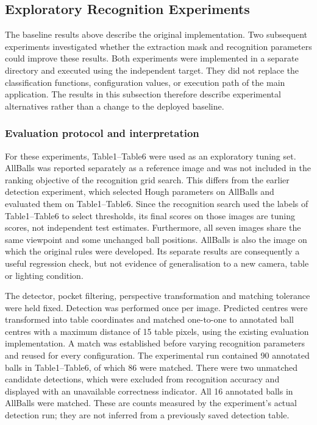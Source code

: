 \subsection{Exploratory Recognition Experiments}
\label{sec:recognition-experiments}

The baseline results above describe the original implementation. Two subsequent
experiments investigated whether the extraction mask and recognition parameters
could improve these results. Both experiments were implemented in a separate
 directory and executed using the independent
 target. They did not replace the classification functions,
configuration values, or execution path of the main application. The results in
this subsection therefore describe experimental alternatives rather than a
change to the deployed baseline.

\subsubsection{Evaluation protocol and interpretation}

For these experiments, Table1--Table6 were used as an exploratory tuning set.
AllBalls was reported separately as a reference image and was not included in
the ranking objective of the recognition grid search. This differs from the
earlier detection experiment, which selected Hough parameters on AllBalls and
evaluated them on Table1--Table6. Since the recognition search used the labels
of Table1--Table6 to select thresholds, its final scores on those images are
tuning scores, not independent test estimates. Furthermore, all seven images
share the same viewpoint and some unchanged ball positions. AllBalls is also
the image on which the original rules were developed. Its separate results
are consequently a useful regression check, but not evidence of generalisation
to a new camera, table or lighting condition.

The detector, pocket filtering, perspective transformation and matching
tolerance were held fixed. Detection was performed once per image. Predicted
centres were transformed into table coordinates and matched one-to-one to
annotated ball centres with a maximum distance of 15 table pixels, using the
existing evaluation implementation. A match was established before varying
recognition parameters and reused for every configuration. The experimental
run contained 90 annotated balls in Table1--Table6, of which 86 were matched.
There were two unmatched candidate detections, which were excluded from
recognition accuracy and displayed with an unavailable correctness indicator.
All 16 annotated balls in AllBalls were matched. These are counts measured
by the experiment's actual detection run; they are not inferred from a
previously saved detection table.

